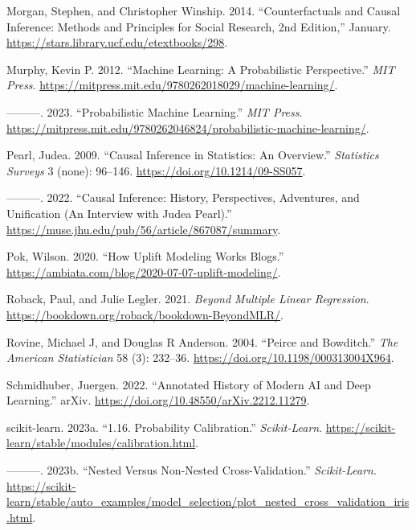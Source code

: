 \documentclass[
  letterpaper,
]{krantz}
\newlength{\cslhangindent}
\newenvironment{CSLReferences}[2] %
 {\begin{list}{}{%
  \setlength{\itemindent}{0pt}
  \setlength{\leftmargin}{0pt}
  \setlength{\parsep}{0pt}
  \ifodd #1
   \setlength{\leftmargin}{\cslhangindent}
   \setlength{\itemindent}{-1\cslhangindent}
  \fi
  \setlength{\itemsep}{#2\baselineskip}}}
 {\end{list}}
\begin{document}
\begin{CSLReferences}{1}{0}
Morgan, Stephen, and Christopher Winship. 2014. {``Counterfactuals and
{Causal} {Inference}: {Methods} and {Principles} for {Social}
{Research}, 2nd {Edition},''} January.
\url{https://stars.library.ucf.edu/etextbooks/298}.

Murphy, Kevin P. 2012. {``Machine {Learning}: {A} {Probabilistic}
{Perspective}.''} \emph{MIT Press}.
\url{https://mitpress.mit.edu/9780262018029/machine-learning/}.

---------. 2023. {``Probabilistic {Machine} {Learning}.''} \emph{MIT
Press}.
\url{https://mitpress.mit.edu/9780262046824/probabilistic-machine-learning/}.

Pearl, Judea. 2009. {``Causal Inference in Statistics: {An} Overview.''}
\emph{Statistics Surveys} 3 (none): 96--146.
\url{https://doi.org/10.1214/09-SS057}.

---------. 2022. {``Causal {Inference}: {History}, {Perspectives},
{Adventures}, and {Unification} ({An} {Interview} with {Judea}
{Pearl}).''} \url{https://muse.jhu.edu/pub/56/article/867087/summary}.

Pok, Wilson. 2020. {``How Uplift Modeling Works {\textbar} {Blogs}.''}
\url{https://ambiata.com/blog/2020-07-07-uplift-modeling/}.

Roback, Paul, and Julie Legler. 2021. \emph{Beyond {Multiple} {Linear}
{Regression}}. \url{https://bookdown.org/roback/bookdown-BeyondMLR/}.

Rovine, Michael J, and Douglas R Anderson. 2004. {``Peirce and
{Bowditch}.''} \emph{The American Statistician} 58 (3): 232--36.
\url{https://doi.org/10.1198/000313004X964}.

Schmidhuber, Juergen. 2022. {``Annotated {History} of {Modern} {AI} and
{Deep} {Learning}.''} arXiv.
\url{https://doi.org/10.48550/arXiv.2212.11279}.

scikit-learn. 2023a. {``1.16. {Probability} Calibration.''}
\emph{Scikit-Learn}.
\url{https://scikit-learn/stable/modules/calibration.html}.

---------. 2023b. {``Nested Versus Non-Nested Cross-Validation.''}
\emph{Scikit-Learn}.
\url{https://scikit-learn/stable/auto_examples/model_selection/plot_nested_cross_validation_iris.html}.


\end{CSLReferences}
\end{document}
